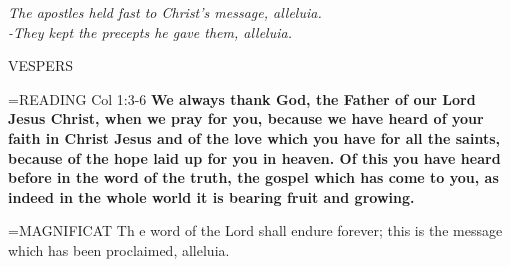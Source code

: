 \begin{center}
\textit{The apostles held fast to Christ’s message, alleluia.\\
-They kept the precepts he gave them, alleluia.}
\end{center}

\begin{flushleft}\normalsize VESPERS\\\end{flushleft}

\hangindent=\parindent \small{READING} Col 1:3-6 \textbf{We always thank God, the Father of our Lord
Jesus Christ, when we pray for you, because we have heard of your
faith in Christ Jesus and of the love which you have for all the
saints, because of the hope laid up for you in heaven. Of this you
have heard before in the word of the truth, the gospel which has
come to you, as indeed in the whole world it is bearing fruit and
growing.\\}
 
\hangindent=\parindent \small{MAGNIFICAT  Th e word of the Lord shall endure forever; this is the
message which has been proclaimed, alleluia.\\}
 
